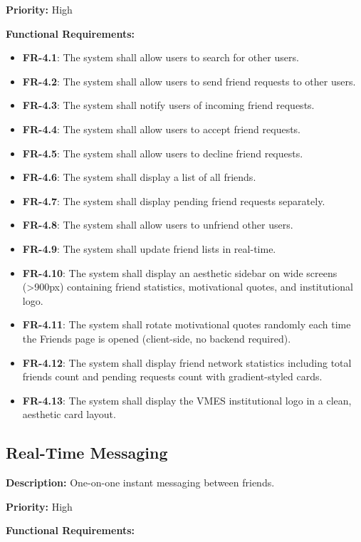 \documentclass[12pt,a4paper]{article}
\begin{document}
\textbf{Priority:} High

\textbf{Functional Requirements:}

\begin{itemize}
    \item \textbf{FR-4.1}: The system shall allow users to search for other users.
    \item \textbf{FR-4.2}: The system shall allow users to send friend requests to other users.
    \item \textbf{FR-4.3}: The system shall notify users of incoming friend requests.
    \item \textbf{FR-4.4}: The system shall allow users to accept friend requests.
    \item \textbf{FR-4.5}: The system shall allow users to decline friend requests.
    \item \textbf{FR-4.6}: The system shall display a list of all friends.
    \item \textbf{FR-4.7}: The system shall display pending friend requests separately.
    \item \textbf{FR-4.8}: The system shall allow users to unfriend other users.
    \item \textbf{FR-4.9}: The system shall update friend lists in real-time.
    \item \textbf{FR-4.10}: The system shall display an aesthetic sidebar on wide screens (>900px) containing friend statistics, motivational quotes, and institutional logo.
    \item \textbf{FR-4.11}: The system shall rotate motivational quotes randomly each time the Friends page is opened (client-side, no backend required).
    \item \textbf{FR-4.12}: The system shall display friend network statistics including total friends count and pending requests count with gradient-styled cards.
    \item \textbf{FR-4.13}: The system shall display the VMES institutional logo in a clean, aesthetic card layout.
\end{itemize}

\subsection{Real-Time Messaging}
\textbf{Description:} One-on-one instant messaging between friends.

\textbf{Priority:} High

\textbf{Functional Requirements:}
\end{document}
